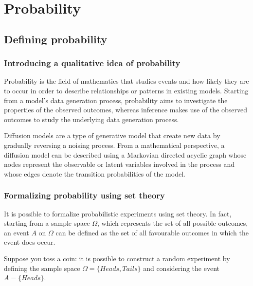 \documentclass{report}
\begin{document}
\tableofcontents

\part{Probability}

\chapter{Defining probability}
\section{Introducing a qualitative idea of probability}
Probability is the field of mathematics that studies events and how likely they are to occur in order to describe relationships or patterns in existing models. \newline
Starting from a model's data generation process, probability aims to investigate the properties of the observed outcomes, whereas inference makes use of the observed outcomes to study the underlying data generation process.
\begin{examplebox}
    Diffusion models are a type of generative model that create new data by gradually reversing a noising process. \newline
    From a mathematical perspective, a diffusion model can be described using a Markovian directed acyclic graph whose nodes represent the observable or latent variables involved in the process and whose edges denote the transition probabilities of the model.
\end{examplebox}
\section{Formalizing probability using set theory}
It is possible to formalize probabilistic experiments using set theory. \newline
In fact, starting from a sample space $\displaystyle \Omega$, which represents the set of all possible outcomes, an event $\displaystyle A$ on $\displaystyle \Omega$ can be defined as the set of all favourable outcomes in which the event does occur.
\begin{examplebox}
    Suppose you toss a coin: it is possible to construct a random experiment by defining the sample space $\displaystyle \Omega = \{Heads, Tails\}$ and considering the event $\displaystyle A = \{Heads\}$.
\end{examplebox}
\end{document}
